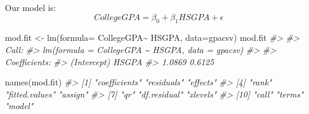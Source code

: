\documentclass[
]{book}
\newenvironment{Shaded}{\begin{snugshade}}{\end{snugshade}}
\newcommand{\AttributeTok}[1]{\textcolor[rgb]{0.77,0.63,0.00}{#1}}
\newcommand{\CommentTok}[1]{\textcolor[rgb]{0.56,0.35,0.01}{\textit{#1}}}
\newcommand{\DecValTok}[1]{\textcolor[rgb]{0.00,0.00,0.81}{#1}}
\newcommand{\FunctionTok}[1]{\textcolor[rgb]{0.00,0.00,0.00}{#1}}
\newcommand{\NormalTok}[1]{#1}
\newcommand{\OtherTok}[1]{\textcolor[rgb]{0.56,0.35,0.01}{#1}}
\newcommand{\SpecialCharTok}[1]{\textcolor[rgb]{0.00,0.00,0.00}{#1}}
\begin{document}
Our model is:\[CollegeGPA=\beta_0+\beta_1HSGPA+\epsilon\]

\begin{Shaded}
\begin{Highlighting}[]
\NormalTok{mod.fit }\OtherTok{\textless{}{-}} \FunctionTok{lm}\NormalTok{(}\AttributeTok{formula=}\NormalTok{ CollegeGPA}\SpecialCharTok{\textasciitilde{}}\NormalTok{ HSGPA, }\AttributeTok{data=}\NormalTok{gpacsv)}
\NormalTok{mod.fit}
\CommentTok{\#\textgreater{} }
\CommentTok{\#\textgreater{} Call:}
\CommentTok{\#\textgreater{} lm(formula = CollegeGPA \textasciitilde{} HSGPA, data = gpacsv)}
\CommentTok{\#\textgreater{} }
\CommentTok{\#\textgreater{} Coefficients:}
\CommentTok{\#\textgreater{} (Intercept)        HSGPA  }
\CommentTok{\#\textgreater{}      1.0869       0.6125}
\end{Highlighting}
\end{Shaded}

\begin{Shaded}
\begin{Highlighting}[]
\FunctionTok{names}\NormalTok{(mod.fit)}
\CommentTok{\#\textgreater{}  [1] "coefficients"  "residuals"     "effects"      }
\CommentTok{\#\textgreater{}  [4] "rank"          "fitted.values" "assign"       }
\CommentTok{\#\textgreater{}  [7] "qr"            "df.residual"   "xlevels"      }
\CommentTok{\#\textgreater{} [10] "call"          "terms"         "model"}
\end{Highlighting}
\end{Shaded}

\begin{Shaded}
\end{Shaded}

\begin{Shaded}
\end{Shaded}
\end{document}
